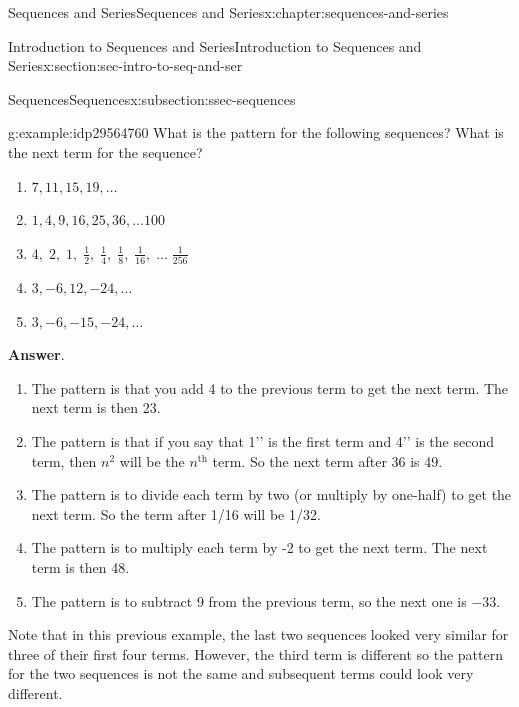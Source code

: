 \documentclass[twoside,10pt,]{book}
\newcommand{\blocktitlefont}{\relax}
\numberwithin{equation}{section}
\newcommand{\nth}{{n^{\text{th}}}}
\begin{document}
\begin{chapterptx}{Sequences and Series}{}{Sequences and Series}{}{}{x:chapter:sequences-and-series}
\begin{sectionptx}{Introduction to Sequences and Series}{}{Introduction to Sequences and Series}{}{}{x:section:sec-intro-to-seq-and-ser}
\begin{subsectionptx}{Sequences}{}{Sequences}{}{}{x:subsection:ssec-sequences}
\begin{example}{}{g:example:idp29564760}
What is the pattern for the following sequences?  What is the next term for the sequence? %
\begin{enumerate}[label=(\alph*)]
\item{}\(\displaystyle 7,11,15,19,\ldots \)%
\item{}\(\displaystyle 1, 4, 9, 16, 25, 36, \ldots 100 \)%
\item{}\(\displaystyle 4,\;2,\;1,\;\frac{1}{2},\;\frac{1}{4},\;\frac{1}{8},\;\frac{1}{{16}},\;...\;\frac{1}{{256}} \)%
\item{}\(\displaystyle 3, -6, 12, -24, \ldots \)%
\item{}\(\displaystyle 3, -6, -15, -24, \ldots \)%
\end{enumerate}
\par\smallskip%
\noindent\textbf{\blocktitlefont Answer}.\label{g:answer:idp29565400}{}\hypertarget{g:answer:idp29565400}{}\quad{}%
\begin{enumerate}[label=(\alph*)]
\item{}The pattern is that you add 4 to the previous term to get the next term.  The next term is then 23.%
\item{}The pattern is that if you say that \textasciigrave{}\textasciigrave{}1'{}'{} is the first term and \textasciigrave{}\textasciigrave{}4'{}'{} is the second term, then \(n^2\) will be the \(\nth{}\) term.  So the next term after 36 is 49.%
\item{}The pattern is to divide each term by two (or multiply by one-half) to get the next term.  So the term after \textdollar{}1\slash{}16\textdollar{} will be \textdollar{}1\slash{}32\textdollar{}.%
\item{}The pattern is to multiply each term by \textdollar{}-2\textdollar{} to get the next term.  The next term is then 48.%
\item{}The pattern is to subtract 9 from the previous term, so the next one is \(-33\).%
\end{enumerate}
\end{example}
%
\par
Note that in this previous example, the last two sequences looked very similar for three of their first four terms.  However, the third term is different so the pattern for the two sequences is not the same and subsequent terms could look very different.%
\end{subsectionptx}
%
%
\typeout{************************************************}
\typeout{************************************************}

\end{sectionptx}
\end{chapterptx}
\end{document}
